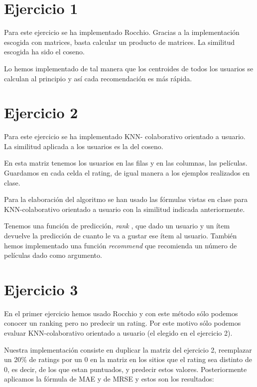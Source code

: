 \documentclass[palatino]{apuntes}
\begin{document}
\section{Ejercicio 1}

	Para este ejercicio se ha implementado Rocchio.
	Gracias a la implementación escogida con matrices, basta calcular un producto de matrices.
	La similitud escogida ha sido el coseno.
	
	Lo hemos implementado de tal manera que los centroides de todos los usuarios se calculan al principio y así cada recomendación es más rápida.
	



\section{Ejercicio 2}

	Para este ejercicio se ha implementado KNN- colaborativo orientado a usuario. 
	La similitud aplicada a los usuarios es la del coseno.

 	En esta matriz tenemos los usuarios en las filas y en las columnas, las películas. 
 	Guardamos en cada celda el rating, de igual manera a los ejemplos realizados en clase.

 	Para la elaboración del algoritmo se han usado las fórmulas vistas en clase para KNN-colaborativo orientado a usuario con la similitud indicada anteriormente.

 	Tenemos una función de predicción, \textit{rank} , que dado un usuario y un ítem devuelve la predicción de cuanto le va a gustar ese ítem al usuario.
  	También hemos implementado una función \textit{recommend} que recomienda un número de películas dado como argumento.


\section{Ejercicio 3}

   En el primer ejercicio hemos usado Rocchio y con este método sólo podemos conocer un ranking pero no predecir un rating. 
   Por este motivo sólo podemos evaluar KNN-colaborativo orientado a usuario (el elegido en el ejercicio 2).

   Nuestra implementación consiste en duplicar la matriz del ejercicio 2, reemplazar un 20\% de ratings por un 0 en la matriz  en los sitios que el rating sea distinto de 0, es decir, de los que estan puntuados, y predecir estos valores.
   Posteriormente aplicamos la fórmula de MAE y de MRSE y estos son los resultados:
\end{document}
